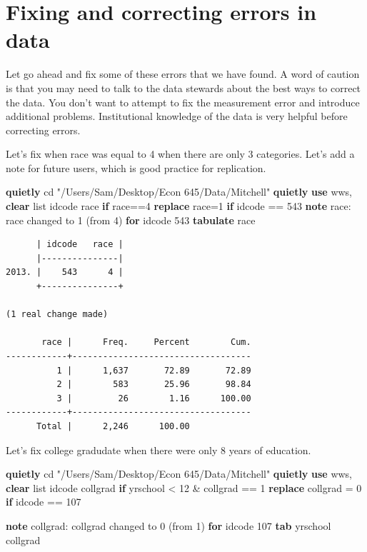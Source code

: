 \documentclass[
]{book}
\newenvironment{Shaded}{\begin{snugshade}}{\end{snugshade}}
\newcommand{\KeywordTok}[1]{\textcolor[rgb]{0.13,0.29,0.53}{\textbf{#1}}}
\newcommand{\NormalTok}[1]{#1}
\newcommand{\OtherTok}[1]{\textcolor[rgb]{0.56,0.35,0.01}{#1}}
\newcommand{\StringTok}[1]{\textcolor[rgb]{0.31,0.60,0.02}{#1}}
\begin{document}
\section{Fixing and correcting errors in data}\label{fixing-and-correcting-errors-in-data}

Let go ahead and fix some of these errors that we have found. A word of caution is that you may need to talk to the data stewards about the best ways to correct the data. You don't want to attempt to fix the measurement error and introduce additional problems. Institutional knowledge of the data is very helpful before correcting errors.

Let's fix when race was equal to 4 when there are only 3 categories. Let's add a note for future users, which is good practice for replication.

\begin{Shaded}
\begin{Highlighting}[]
\KeywordTok{quietly}\NormalTok{ cd }\StringTok{"/Users/Sam/Desktop/Econ 645/Data/Mitchell"}
\KeywordTok{quietly} \KeywordTok{use}\NormalTok{ wws, }\KeywordTok{clear}
\OtherTok{list}\NormalTok{ idcode race }\KeywordTok{if}\NormalTok{ race==4}
\KeywordTok{replace}\NormalTok{ race=1 }\KeywordTok{if}\NormalTok{ idcode == 543}
\KeywordTok{note}\NormalTok{ race: race changed to 1 (from 4) }\KeywordTok{for}\NormalTok{ idcode 543}
\KeywordTok{tabulate}\NormalTok{ race}
\end{Highlighting}
\end{Shaded}

\begin{verbatim}
      | idcode   race |
      |---------------|
2013. |    543      4 |
      +---------------+

(1 real change made)

       race |      Freq.     Percent        Cum.
------------+-----------------------------------
          1 |      1,637       72.89       72.89
          2 |        583       25.96       98.84
          3 |         26        1.16      100.00
------------+-----------------------------------
      Total |      2,246      100.00
\end{verbatim}

Let's fix college gradudate when there were only 8 years of education.

\begin{Shaded}
\begin{Highlighting}[]
\KeywordTok{quietly}\NormalTok{ cd }\StringTok{"/Users/Sam/Desktop/Econ 645/Data/Mitchell"}
\KeywordTok{quietly} \KeywordTok{use}\NormalTok{ wws, }\KeywordTok{clear}
\OtherTok{list}\NormalTok{ idcode collgrad }\KeywordTok{if}\NormalTok{ yrschool \textless{} 12 \& collgrad == 1}
\KeywordTok{replace}\NormalTok{ collgrad = 0 }\KeywordTok{if}\NormalTok{ idcode == 107}

\KeywordTok{note}\NormalTok{ collgrad: collgrad changed to 0 (from 1) }\KeywordTok{for}\NormalTok{ idcode 107}
\KeywordTok{tab}\NormalTok{ yrschool collgrad}
\end{Highlighting}
\end{Shaded}
\end{document}

